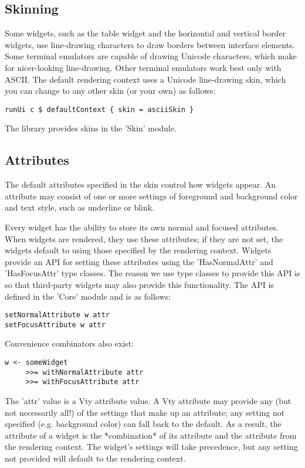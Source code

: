 \documentclass[11pt, letterpaper, oneside, titlepage]{article}
\begin{document}
\subsection{Skinning}

Some widgets, such as the table widget and the horizontal and vertical
border widgets, use line-drawing characters to draw borders between
interface elements.  Some terminal emulators are capable of drawing
Unicode characters, which make for nicer-looking line-drawing.  Other
terminal emulators work best only with ASCII.  The default rendering
context uses a Unicode line-drawing skin, which you can change to any
other skin (or your own) as follows:

\begin{verbatim}
runUi c $ defaultContext { skin = asciiSkin }
\end{verbatim}

The library provides skins in the 'Skin' module.

\subsection{Attributes}

The default attributes specified in the skin control how widgets appear.
An attribute may consist of one or more settings of foreground and
background color and text style, such as underline or blink.

Every widget has the ability to store its own normal and focused
attributes.  When widgets are rendered, they use these attributes; if
they are not set, the widgets default to using those specified by the
rendering context.  Widgets provide an API for setting these attributes
using the 'HasNormalAttr' and 'HasFocusAttr' type classes.  The reason
we use type classes to provide this API is so that third-party widgets
may also provide this functionality.  The API is defined in the 'Core'
module and is as follows:

\begin{verbatim}
setNormalAttribute w attr
setFocusAttribute w attr
\end{verbatim}

Convenience combinators also exist:

\begin{verbatim}
w <- someWidget
     >>= withNormalAttribute attr
     >>= withFocusAttribute attr
\end{verbatim}

The 'attr' value is a Vty attribute value.  A Vty attribute may provide
any (but not necessarily all!) of the settings that make up an
attribute; any setting not specified (e.g. background color) can fall
back to the default.  As a result, the attribute of a widget is the
*combination* of its attribute and the attribute from the rendering
context.  The widget's settings will take precedence, but any setting
not provided will default to the rendering context.
\end{document}
